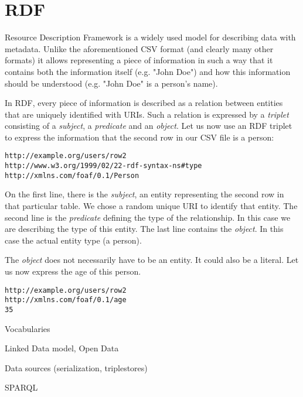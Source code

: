 \section{RDF}

Resource Description Framework is a widely used model for describing data with metadata. Unlike the aforementioned CSV format (and clearly many other formats) it allows representing a piece of information in such a way that it contains both the information itself (e.g. "John Doe") and how this information should be understood (e.g. "John Doe" is a person's name). 

In RDF, every piece of information is described as a relation between entities that are uniquely identified with URIs. Such a relation is expressed by a \emph{triplet} consisting of a \emph{subject}, a \emph{predicate} and an \emph{object}. Let us now use an RDF triplet to express the information that the second row in our CSV file is a person:

\begin{verbatim}
http://example.org/users/row2
http://www.w3.org/1999/02/22-rdf-syntax-ns#type 
http://xmlns.com/foaf/0.1/Person
\end{verbatim}

On the first line, there is the \emph{subject}, an entity representing the second row in that particular table. We chose a random unique URI to identify that entity. The second line is the \emph{predicate} defining the type of the relationship. In this case we are describing the type of this entity. The last line contains the \emph{object}. In this case the actual entity type (a person). 

The \emph{object} does not necessarily have to be an entity. It could also be a literal. Let us now express the age of this person.

\begin{verbatim}
http://example.org/users/row2
http://xmlns.com/foaf/0.1/age
35
\end{verbatim}

Vocabularies


Linked Data model, Open Data

Data sources (serialization, triplestores)

SPARQL

 
